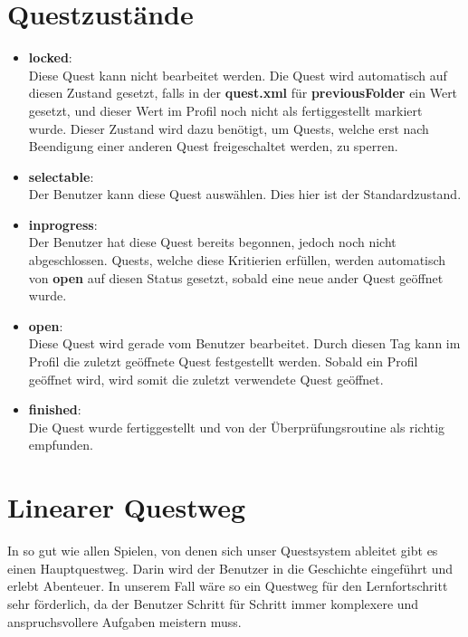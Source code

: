 


\section{Questzustände}
\label{sec:Queststate}
\begin{itemize}
\item \textbf{locked}:\\ Diese Quest kann nicht bearbeitet werden. Die Quest wird automatisch auf diesen Zustand gesetzt, falls in der \textbf{quest.xml} für \textbf{previousFolder} ein Wert gesetzt, und dieser Wert im Profil noch nicht als fertiggestellt markiert wurde. Dieser Zustand wird dazu benötigt, um Quests, welche erst nach Beendigung einer anderen Quest freigeschaltet werden, zu sperren.
\item \textbf{selectable}:\\ Der Benutzer kann diese Quest auswählen. Dies hier ist der Standardzustand.
\item \textbf{inprogress}:\\ Der Benutzer hat diese Quest bereits begonnen, jedoch noch nicht abgeschlossen. Quests, welche diese Kritierien erfüllen, werden automatisch von \textbf{open} auf diesen Status gesetzt, sobald eine neue ander Quest geöffnet wurde.
\item \textbf{open}:\\ Diese Quest wird gerade vom Benutzer bearbeitet. Durch diesen Tag kann im Profil die zuletzt geöffnete Quest festgestellt werden. Sobald ein Profil geöffnet wird, wird somit die zuletzt verwendete Quest geöffnet.
\item \textbf{finished}:\\ Die Quest wurde fertiggestellt und von der Überprüfungsroutine als richtig empfunden.
\end{itemize}

\section{Linearer Questweg}
In so gut wie allen Spielen, von denen sich unser Questsystem ableitet gibt es einen Hauptquestweg. Darin wird der Benutzer in die Geschichte eingeführt und erlebt Abenteuer. In unserem Fall wäre so ein Questweg für den Lernfortschritt sehr förderlich, da der Benutzer Schritt für Schritt immer komplexere und anspruchsvollere Aufgaben meistern muss.

